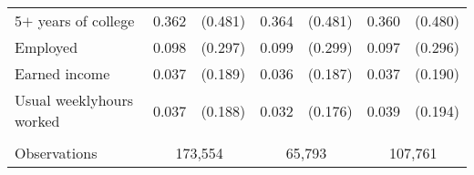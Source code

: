 \begin{tabular}{lcccccc}
 \hspace{0.3cm} 5$+$ years of college  & 0.362 & (0.481)  & 0.364 & (0.481)  & 0.360 & (0.480)  \\
 Employed  & 0.098 & (0.297)  & 0.099 & (0.299)  & 0.097 & (0.296)  \\
 Earned income  & 0.037 & (0.189)  & 0.036 & (0.187)  & 0.037 & (0.190)  \\
 Usual weeklyhours worked  & 0.037 & (0.188)  & 0.032 & (0.176)  & 0.039 & (0.194)  \\
\\
Observations & \multicolumn{2}{c}{173,554} & \multicolumn{2}{c}{65,793} & \multicolumn{2}{c}{107,761} \\
\bottomrule
\bottomrule
\end{tabular}